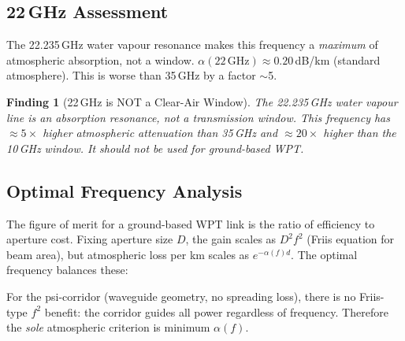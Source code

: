 \documentclass[aps,prd,twocolumn,superscriptaddress]{revtex4-2}
\newtheorem{finding}{Finding}
\begin{document}
\subsection{22\,GHz Assessment}

The 22.235\,GHz water vapour resonance makes this frequency a
\emph{maximum} of atmospheric absorption, not a window.
$\alpha(22\,\mathrm{GHz}) \approx 0.20$\,dB/km (standard atmosphere).
This is worse than 35\,GHz by a factor $\sim$5.

\begin{finding}[22\,GHz is NOT a Clear-Air Window]
The 22.235\,GHz water vapour line is an absorption resonance, not
a transmission window.  This frequency has $\approx 5\times$ higher
atmospheric attenuation than 35\,GHz and $\approx 20\times$ higher
than the 10\,GHz window.  It should not be used for ground-based WPT.
\end{finding}

\subsection{Optimal Frequency Analysis}

The figure of merit for a ground-based WPT link is the ratio of
efficiency to aperture cost.  Fixing aperture size $D$, the gain
scales as $D^2 f^2$ (Friis equation for beam area), but atmospheric
loss per km scales as $e^{-\alpha(f) d}$.  The optimal frequency
balances these:

For the psi-corridor (waveguide geometry, no spreading loss), there
is no Friis-type $f^2$ benefit: the corridor guides all power regardless
of frequency.  Therefore the \emph{sole} atmospheric criterion is
minimum $\alpha(f)$.
\end{document}
